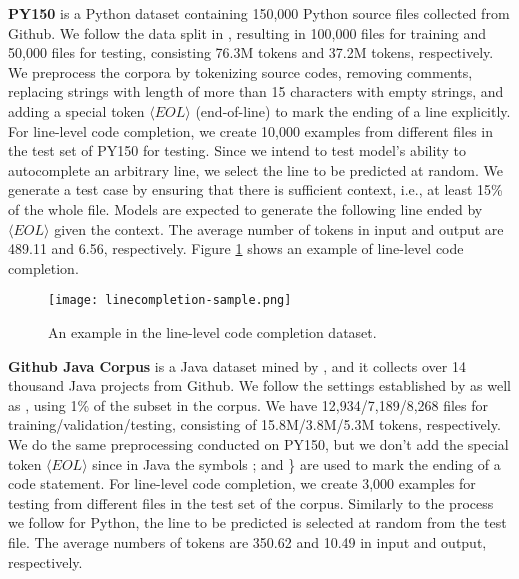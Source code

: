 \documentclass[sigconf,nonacm,screen]{acmart}
\begin{document}
 \textbf{PY150} is a Python dataset \cite{raychev2016probabilistic} containing 150,000 Python source files collected from Github. We follow the data split in \citet{raychev2016probabilistic}, resulting in 100,000 files for training and 50,000 files for testing, consisting 76.3M tokens and 37.2M tokens, respectively. We preprocess the corpora by tokenizing source codes, removing comments, replacing strings with length of more than 15 characters with empty strings, and adding a special token $\langle\mathit{EOL}\rangle$ (end-of-line) to mark the ending of a line explicitly. For line-level code completion, we create 10,000 examples from different files in the test set of PY150 for testing. 
 Since we intend to test model's ability to autocomplete an arbitrary line, we select the line to be predicted at random. 
  We generate a test case by ensuring that there is sufficient context, i.e., at least 15\% of the whole file.
Models are expected to generate the following line ended by $\langle\mathit{EOL}\rangle$ given the context.
The average number of tokens in input and output are 489.11 and 6.56, respectively. Figure \ref{fig:linecompletion-sample} shows an example of line-level code completion. 


  
 \begin{figure}[h]
    \texttt{[image: linecompletion-sample.png]}
    \caption{An example in the line-level code completion dataset.}
    \label{fig:linecompletion-sample}
\end{figure}

 \textbf{Github Java Corpus} is a Java dataset mined by \citet{allamanis2013mining}, and it collects over 14 thousand Java projects from Github. We follow the settings established by \citet{hellendoorn2017deep} as well as \citet{karampatsis2020big}, using 1\% of the subset in the corpus. We have 12,934/7,189/8,268 files for training/validation/testing, consisting of 15.8M/3.8M/5.3M tokens, respectively. We do the same preprocessing conducted on PY150, but we don't add the special token $\langle\mathit{EOL}\rangle$ since in Java the symbols ; and \} are used to mark the ending of a code statement. For line-level code completion, we create 3,000 examples for testing from different files in the test set of the corpus. 
 Similarly to the process we follow for Python, 
the line to be predicted is selected at random from the test file.
The average numbers of tokens are 350.62 and 10.49 in input and output, respectively.
\end{document}
